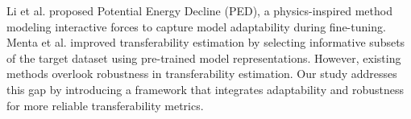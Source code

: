 
Li et al. \cite{li2023exploring} proposed Potential Energy Decline (PED), a physics-inspired method modeling interactive forces to capture model adaptability during fine-tuning. Menta et al. \cite{menta2024active} improved transferability estimation by selecting informative subsets of the target dataset using pre-trained model representations. However, existing methods overlook robustness in transferability estimation. Our study addresses this gap by introducing a framework that integrates adaptability and robustness for more reliable transferability metrics.